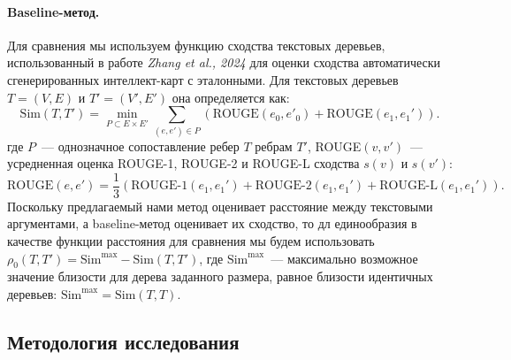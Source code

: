 \documentclass[12pt]{article}
\begin{document}
\paragraph{Baseline-метод.} Для сравнения мы используем функцию сходства текстовых деревьев, использованный в работе \textit{Zhang et al., 2024} для оценки сходства автоматически сгенерированных интеллект-карт с эталонными. Для текстовых деревьев $T=(V, E)$ и $T'=(V',E')$ она определяется как:
$$
\text{Sim}(T, T') = \min\limits_{P\subset E\times E'} \sum\limits_{(e, e')\in P}\left(\text{ROUGE}(e_0, e'_0) + \text{ROUGE}(e_1, e_1')\right).
$$
где $P$~--- однозначное сопоставление ребер $T$ ребрам $T'$, ROUGE$(v, v')$~--- усредненная оценка ROUGE-1, ROUGE-2 и ROUGE-L сходства $s(v)$ и $s(v')$:
$$
\text{ROUGE}(e, e') = \frac{1}{3}\left(\text{ROUGE-1}(e_1, e_1')+\text{ROUGE-2}(e_1, e_1')+\text{ROUGE-L}(e_1, e_1')\right).
$$
Поскольку предлагаемый нами метод оценивает расстояние между текстовыми аргументами, а baseline-метод оценивает их сходство, то дл единообразия в качестве функции расстояния для сравнения мы будем использовать $\rho_0(T, T') = \text{Sim}^{\text{max}}-\text{Sim}(T, T')$, где $\text{Sim}^{\text{max}}$~--- максимально возможное значение близости для дерева заданного размера, равное близости идентичных деревьев: $\text{Sim}^{\text{max}} = \text{Sim}(T, T)$.

\subsection{Методология исследования}
\end{document}
